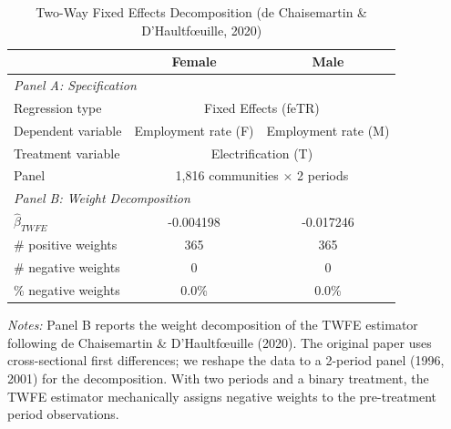 \begin{table}[htbp]
\centering
\caption{Two-Way Fixed Effects Decomposition (de Chaisemartin \& D'Haultf\oe uille, 2020)}
\label{tab:dinkelman_twfe}
\begin{tabular}{lcc}
\toprule
 & Female & Male \\
\midrule
\multicolumn{3}{l}{\textit{Panel A: Specification}} \\[3pt]
Regression type & \multicolumn{2}{c}{Fixed Effects (feTR)} \\
Dependent variable & Employment rate (F) & Employment rate (M) \\
Treatment variable & \multicolumn{2}{c}{Electrification (T)} \\
Panel & \multicolumn{2}{c}{1{,}816 communities $\times$ 2 periods} \\[6pt]
\multicolumn{3}{l}{\textit{Panel B: Weight Decomposition}} \\[3pt]
$\hat{\beta}_{TWFE}$ & -0.004198 & -0.017246 \\
\# positive weights & 365 & 365 \\
\# negative weights & 0 & 0 \\
\% negative weights &   0.0\% &   0.0\% \\
\bottomrule
\end{tabular}

\vspace{6pt}
\begin{minipage}{0.92\textwidth}
\footnotesize
\textit{Notes:} Panel B reports the weight decomposition of the TWFE estimator 
following de Chaisemartin \& D'Haultf\oe uille (2020). 
The original paper uses cross-sectional first differences; we reshape 
the data to a 2-period panel (1996, 2001) for the decomposition. 
With two periods and a binary treatment, the TWFE estimator mechanically 
assigns negative weights to the pre-treatment period observations.
\end{minipage}
\end{table}
